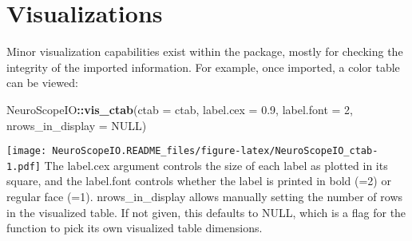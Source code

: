 \documentclass[]{article}
\newenvironment{Shaded}{\begin{snugshade}}{\end{snugshade}}
\newcommand{\CommentTok}[1]{\textcolor[rgb]{0.56,0.35,0.01}{\textit{#1}}}
\newcommand{\DataTypeTok}[1]{\textcolor[rgb]{0.13,0.29,0.53}{#1}}
\newcommand{\DecValTok}[1]{\textcolor[rgb]{0.00,0.00,0.81}{#1}}
\newcommand{\FloatTok}[1]{\textcolor[rgb]{0.00,0.00,0.81}{#1}}
\newcommand{\KeywordTok}[1]{\textcolor[rgb]{0.13,0.29,0.53}{\textbf{#1}}}
\newcommand{\NormalTok}[1]{#1}
\newcommand{\OperatorTok}[1]{\textcolor[rgb]{0.81,0.36,0.00}{\textbf{#1}}}
\newcommand{\OtherTok}[1]{\textcolor[rgb]{0.56,0.35,0.01}{#1}}
\begin{document}
\begin{Shaded}
\end{Shaded}

\hypertarget{visualizations}{%
\section{Visualizations}\label{visualizations}}

Minor visualization capabilities exist within the package, mostly for checking the integrity of the imported information. For example, once imported, a color table can be viewed:

\begin{Shaded}
\begin{Highlighting}[]
\NormalTok{NeuroScopeIO}\OperatorTok{::}\KeywordTok{vis_ctab}\NormalTok{(}\DataTypeTok{ctab =}\NormalTok{ ctab, }\DataTypeTok{label.cex =} \FloatTok{0.9}\NormalTok{, }\DataTypeTok{label.font =} \DecValTok{2}\NormalTok{, }\DataTypeTok{nrows_in_display =} \OtherTok{NULL}\NormalTok{)}
\end{Highlighting}
\end{Shaded}

\texttt{[image: NeuroScopeIO.README\_files/figure-latex/NeuroScopeIO\_ctab-1.pdf]}
The label.cex argument controls the size of each label as plotted in its square, and the label.font controls whether the label is printed in bold (=2) or regular face (=1). nrows\_in\_display allows manually setting the number of rows in the visualized table. If not given, this defaults to NULL, which is a flag for the function to pick its own visualized table dimensions.
\end{document}
